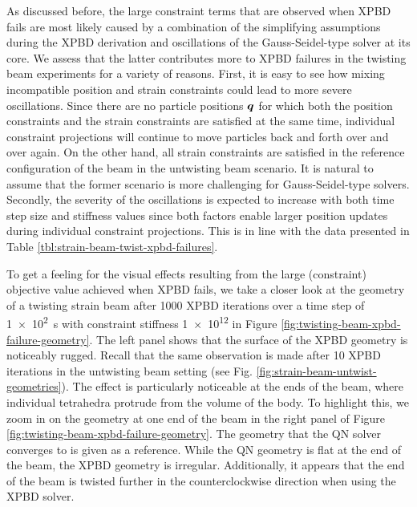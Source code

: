 As discussed before, the large constraint terms that are observed when XPBD fails are most likely caused by a combination of the simplifying 
assumptions during the XPBD derivation and oscillations of the Gauss-Seidel-type solver at its core. We assess that the latter contributes 
more to XPBD failures in the twisting beam experiments for a variety of reasons. First, it is easy to see how mixing incompatible 
position and strain constraints could lead to more severe oscillations. Since there are no particle positions $\bm{q}$ for which both the position constraints and the 
strain constraints are satisfied at the same time, individual constraint projections will continue to move particles back and forth over and over again. 
On the other hand, all strain constraints are satisfied in the reference configuration of the beam in the untwisting beam scenario. It is natural to 
assume that the former scenario is more challenging for Gauss-Seidel-type solvers. Secondly, the severity of the oscillations is expected to increase with both 
time step size and stiffness values since both factors enable larger position updates during individual constraint projections. This is in line with the 
data presented in Table \ref{tbl:strain-beam-twist-xpbd-failures}.

To get a feeling for the visual effects resulting from the large (constraint) objective value achieved when XPBD fails, we take a closer look at the 
geometry of a twisting strain beam after 1000 XPBD iterations over a time step of \SI{1e2}{\second} with constraint stiffness \num{1e12} in 
Figure \ref{fig:twisting-beam-xpbd-failure-geometry}. The left panel shows that the surface of the XPBD geometry is noticeably rugged. Recall that 
the same observation is made after 10 XPBD iterations in the untwisting beam setting (see Fig. \ref{fig:strain-beam-untwist-geometries}). The 
effect is particularly noticeable at the ends of the beam, where individual tetrahedra protrude from the volume of the body. To highlight this, 
we zoom in on the geometry at one end of the beam in the right panel of Figure \ref{fig:twisting-beam-xpbd-failure-geometry}. The geometry that the QN solver 
converges to is given as a reference. While the QN geometry is flat at the end of the beam, the XPBD geometry is irregular. Additionally, it 
appears that the end of the beam is twisted further in the counterclockwise direction when using the XPBD solver.

